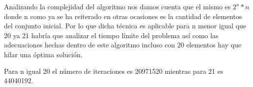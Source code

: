 Analizando la complejidad del algoritmo nos damos cuenta que el mismo es $ 2^{n} * n $ donde n como ya se ha reiterado en otras ocasiones es la cantidad de elementos del conjunto inicial. Por lo que dicha técnica es aplicable para n menor igual que 20 ya 21 habría que analizar el tiempo límite del problema así como las adecuaciones hechas dentro de este algoritmo incluso con 20 elementos hay que hilar una óptima solución.

Para n igual 20 el número de iteraciones es 20971520 mientras para 21 es 44040192. 